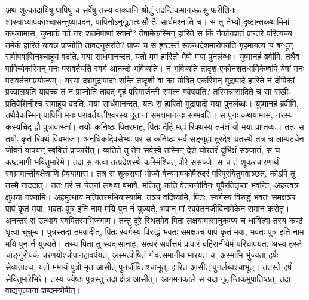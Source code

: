 \adhyAya
{}
\vakya अथ शुल्कादायिषु पापिषु च सर्वेषु तस्य वाक्यानि श्रोतुं तदन्तिकमागच्छत्सु फरीशिनः शास्त्राध्यापकाश्चासन्तुष्यावदन्,
\vakya पापिनोऽनुगृह्णात्यसौ तैः सार्धमश्नाति च।
\vakya स तु तेभ्यो दृष्टान्तकथामिमां कथयामास, युष्माकं को नरः शतमेषाणां स्वामी?
\vakya तेषामेकस्मिन् हारिते स किं नैकोनशतं प्रान्तरे परित्यज्य तमेकं हारितं यावन्न प्राप्नोति तावदनुसरति?
\vakya प्राप्य च स हृष्टस्तं स्कन्धदेशमारोपयति गृहमागत्य च बन्धून् समीपवासिनश्चाहूय वदति, मया सार्धमानन्दत,
\vakya यतो मम हारितो मेषो मया पुनर्लब्धः।
\vakya युष्मानहं ब्रवीमि, तथैव पापिन्येकस्मिन् मनः परावर्तयति स्वर्ग आनन्दो भविष्यति। न भविष्यति तादृश एकोनशतधार्मिकेष्वपि येषां मनः परावर्तनमप्रयोज्यम्।
\vakya यस्या दशमुद्रापादाः सन्ति तादृशी वा का योषित् एकस्मिन् मुद्रापादे हारिते न दीपिकां प्रज्वालयति यावच्च तं न प्राप्नोति तावद् गृहं परिमार्जन्ती समत्नं गवेषयति?
\vakya तस्मिन्नासादिते च सा सखीः प्रतिवेशिनीश्च समाहूय वदति, मया सार्धमानन्दत, यतः स हारितो मुद्रापादो मया पुनर्लब्धः।
\vakya युष्मानहं ब्रवीमि, तथैवैकस्मिन् पापिनि मनः परावर्तयतीश्वरस्य दूतानां समक्षमानन्दः सम्भवति।
\vakya स पुनः कथयामास, नरस्य कस्यचिद् द्वौ पुत्रावास्तां।
\vakya तयोः कनिष्ठः पितरमाह, पितः देहि मह्यं रिक्थस्य तमंशं यो मया प्राप्तव्यः। ततः स तयोः कृते रिक्थं विबभाज।
\vakya अनधिकदिवसेभ्यः परं स कनिष्ठः सर्वं सङ्गृह्य दूरदेशं प्रतस्थे तत्र च लाम्पट्येन जीवनं यापयन् स्ववित्तं प्राकारीत्।
\vakya व्यतिते तु तेन सर्वस्वे तस्मिन् देशे घोरतरं दुर्भिक्षं सञ्जातं, स च कष्टभागी भवितुमारेभे।
\vakya तदा स गत्वा तत्प्रदेशस्थे कस्मिंश्चित् पौरे ससज्जे, स च तं शूकरचारणार्थं स्वग्रामान्तीयक्षेत्राणि प्रेषयामास।
\vakya तत्र स शूकराणां भोज्यै र्वन्यमाषकोषैरुदरं परिपूरयितुमवाञ्छत्, कोऽपि तु तस्मै नाददात्।
\vakya ततः परं स चेतनां लब्ध्वा बभाषे, मत्पितुः कति वेतनजीविनः पूपैरतितृप्ता भवन्ति, अहन्त्वत्र क्षुधया नश्यामि।
\vakya अहमुत्थाय मत्पितरमभियास्यामि, तञ्च वदिष्यामि, पितः, स्वर्गस्य विरुद्धं भवतः समक्षञ्च पापं कृतं मया, भवतः पुत्र इति नाम मयि पुन र्न युज्यते, भवान् मां स्ववेतनजीविनामेकेन समानं करोतु।
\vakya अनन्तरं स उत्थाय स्वपितरमभिजगाम। तन्तु दूरे स्थितमेव पिता लक्षयामासानुकम्प्य च धावित्वा तस्य कण्ठं धृत्वा चुचुम्ब।
\vakya पुत्रस्तदा तमवादीत्, पितः स्वर्गस्य विरुद्धं भवतः समक्षञ्च पापं कृतं मया, भवतः पुत्र इति नाम मयि पुन र्न युज्यते।
\vakya तस्य पिता तु स्वदासानाह, सत्वरं सर्वोत्तमं प्रावारं बहिरानीयेमं परिधापयत, अस्य हस्ते चाङ्गुरीयकं चरणयोश्चोपानहावर्पयत,
\vakya अस्मत्पोषितं गोवत्समानीय मारयत च, अस्माभि र्भुज्यतां हर्षः सेव्यताञ्च,
\vakya यतो ममायं पुत्रो मृत आसीत् पुनर्जीवितश्चाभूत्, हारित आसीत् पुनर्लब्धश्चाभूत्। ततस्ते हर्षं सेवितुमारेभिरे।
\vakya तस्य ज्येष्ठः पुत्रस्तु तदा क्षेत्र आसीत्। आगमनकाले स यदा गृहान्तिकमुपातिष्ठत्, तदा वाद्यनृत्यानां शब्दमश्रौषीत्।
